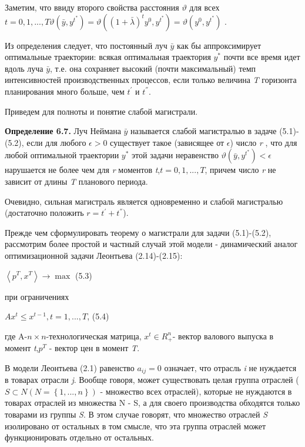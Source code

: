 \documentclass[12pt, 4paper]{book}
\begin{document}
{Заметим, что ввиду второго свойства расстояния $\vartheta$ для всех $t=0,1,...,T \vartheta(\bar{y},y^{t^{*}})=\vartheta((1+\bar{\lambda})^t y^0,y^{t^{*}})=\vartheta (y^{0},y^{t^{*}})$ .
\par

Из определения следует, что постоянный луч $\bar{y}$ как бы аппроксимирует оптимальные траектории: всякая оптимальная траектория $y^{*}$  почти все время идет вдоль луча $\bar{y}$, т.е. она сохраняет высокий (почти максимальный) темп интенсивностей производственных процессов, если только величина \textit{T} горизонта планирования много больше, чем $t^{'}$ и $t^{''}$. 
\par

Приведем для полноты и понятие слабой магистрали.
\par

\textbf{Определение 6.7.} Луч Неймана $\bar{y}$ называется слабой магистралью в задаче (5.1)-(5.2), если для любого $\epsilon > 0$ существует такое (зависящее от $\epsilon$) число \textit{r} , что для любой оптимальной траектории $y^{*}$ этой задачи неравенство $\vartheta(\bar{y},y^{t^{*}})<\epsilon$ нарушается не более чем для \textit{r} моментов \textit{t},$t=0,1,...,T$, причем число \textit{r} не зависит от длины \textit{T} планового периода.
\par

Очевидно, сильная магистраль является одновременно и слабой магистралью (достаточно положить $r=t^{'}+t^{''}$).
\par

Прежде чем сформулировать теорему о магистрали для задачи (5.1)-(5.2), рассмотрим более простой и частный случай этой модели - динамический аналог оптимизационной задачи Леонтьева (2.14)-(2.15):
\begin{center}
$\left\langle p^T,x^T\right\rangle \rightarrow \max$ (5.3)
\end{center}
\begin{center}
при ограничениях
\end{center}
\begin{center}
$A x^t \leq x^{t-1}, t=1,...,T$, (5.4)
\end{center}
где A-$n \times n$-технологическая матрица, $x^t \in R_{+}^n$- вектор валового выпуска в момент \textit{t},$p^T$ - вектор цен в момент \textit{T}.
\par

В модели Леонтьева (2.1) равенство $a_{ij}=0$ означает, что отрасль \textit{i} не нуждается в товарах отрасли \textit{j}. Вообще говоря, может существовать целая группа отраслей ($S \subset N (N=\left\{1,...,n\right\})$ - множество всех отраслей), которые не нуждаются в товарах отраслей из множества N - S, а для своего производства обходятся только товарами из группы \textit{S}. В этом случае говорят, что множество отраслей \textit{S} изолировано от остальных в том смысле, что эта группа отраслей может функционировать отдельно от остальных.
\par

}
\end{document}
